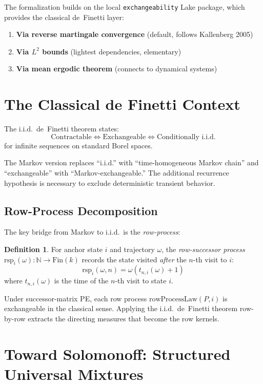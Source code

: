 \documentclass[11pt,a4paper]{article}
\theoremstyle{definition}
\newtheorem{definition}{Definition}[section]
\begin{document}
The formalization builds on the local \texttt{exchangeability} Lake package,
which provides the classical de~Finetti layer:

\begin{enumerate}
\item \textbf{Via reverse martingale convergence} (default, follows Kallenberg 2005)
\item \textbf{Via $L^2$ bounds} (lightest dependencies, elementary)
\item \textbf{Via mean ergodic theorem} (connects to dynamical systems)
\end{enumerate}

\section{The Classical de Finetti Context}

The i.i.d.\ de~Finetti theorem states:
\[
\text{Contractable} \iff \text{Exchangeable} \iff \text{Conditionally i.i.d.}
\]
for infinite sequences on standard Borel spaces.

The Markov version replaces ``i.i.d.'' with ``time-homogeneous Markov chain''
and ``exchangeable'' with ``Markov-exchangeable.'' The additional recurrence
hypothesis is necessary to exclude deterministic transient behavior.

\subsection{Row-Process Decomposition}

The key bridge from Markov to i.i.d.\ is the \emph{row-process}:

\begin{definition}
For anchor state $i$ and trajectory $\omega$, the \emph{row-successor process}
$\mathrm{rsp}_i(\omega) : \mathbb{N} \to \mathrm{Fin}(k)$ records the state
visited \emph{after} the $n$-th visit to $i$:
\[
\mathrm{rsp}_i(\omega, n) = \omega(t_{n,i}(\omega) + 1)
\]
where $t_{n,i}(\omega)$ is the time of the $n$-th visit to state $i$.
\end{definition}

Under successor-matrix PE, each row process
$\mathrm{rowProcessLaw}(P, i)$ is exchangeable in the classical sense.
Applying the i.i.d.\ de~Finetti theorem row-by-row extracts the directing
measures that become the row kernels.

\section{Toward Solomonoff: Structured Universal Mixtures}
\end{document}
